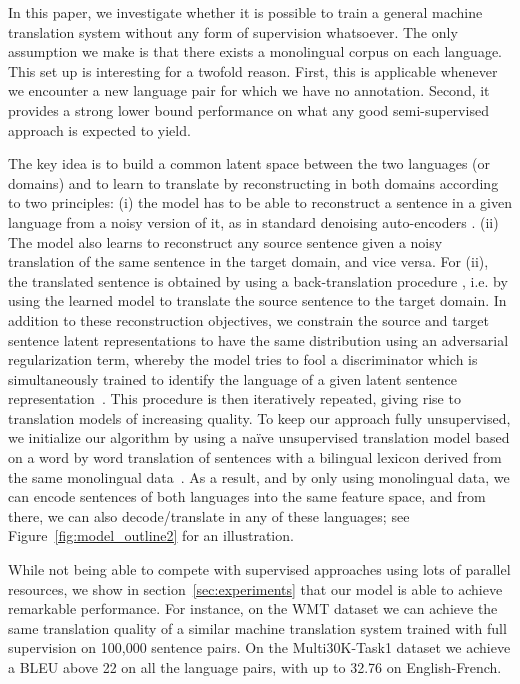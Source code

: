 In this paper, we investigate whether it is possible to train a general machine translation system without any form of supervision whatsoever. The only assumption we make is that there exists a monolingual corpus on each language. This set up is interesting for a twofold reason. First, this is applicable whenever we encounter a new language pair for which we have no annotation. Second, it provides a strong lower bound performance on what any good semi-supervised approach is expected to yield.


The key idea is to build a common latent space between the two languages (or domains) and to learn to translate by reconstructing in both domains according to two principles: (i) the model has to be able to reconstruct a sentence in a given language from a noisy version of it, as in standard denoising auto-encoders \citep{vincent2008extracting}. (ii) The model also learns to reconstruct any source sentence given a noisy translation of the same sentence in the target domain, and vice versa. For (ii), the translated sentence is obtained by using a back-translation procedure \citep{sennrich2015improving}, i.e. by using the learned model to translate the source sentence to the target domain. In addition to these reconstruction objectives, we constrain the source and target sentence latent representations to have the same distribution using an adversarial regularization term, whereby the model tries to fool a discriminator which is simultaneously trained to identify the language of a given latent sentence representation~\citep{ganin}. This procedure is then iteratively repeated, giving rise to translation models of increasing quality. To keep our approach fully unsupervised, we initialize our algorithm by using a na\"ive unsupervised translation model based on a word by word translation of sentences with a bilingual lexicon derived from the same monolingual data~\citep{wordalign17}. As a result, and by only using monolingual data, we can encode sentences of both languages into the same feature space, and from there, we can also decode/translate in any of these languages; see Figure~\ref{fig:model_outline2} for an illustration.

While not being able to compete with supervised approaches using lots of parallel resources, we show in section~\ref{sec:experiments} that our model is able to achieve remarkable performance. 
For instance, on the WMT dataset we can achieve the same translation quality of a similar machine translation system trained with full supervision on 100,000 sentence pairs. On the Multi30K-Task1 dataset we achieve a BLEU above 22 on all the language pairs, with up to 32.76 on English-French.

